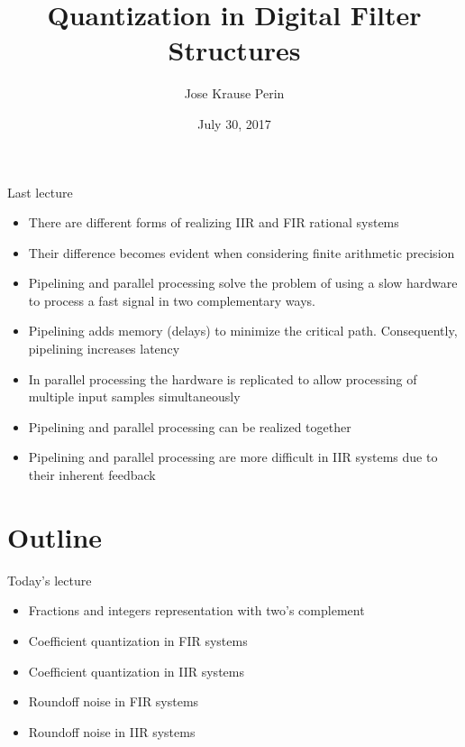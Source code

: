 \documentclass[10pt, aspectratio=169, handout]{beamer}
\title[EE 264]{Quantization in Digital Filter Structures}
\author{Jose Krause Perin}
\institute{Stanford University}
\date{July 30, 2017}
\begin{document}
\begin{frame}
  \titlepage
\end{frame}


\begin{frame}{Last lecture}
\begin{itemize}
	\item There are different forms of realizing IIR and FIR rational systems
	\item Their difference becomes evident when considering finite arithmetic precision
	\item Pipelining and parallel processing solve the problem of using a slow hardware to process a fast signal in two complementary ways. 
	\item Pipelining adds memory (delays) to minimize the critical path. Consequently, pipelining increases latency
	\item In parallel processing the hardware is replicated to allow processing of multiple input samples simultaneously
	\item Pipelining and parallel processing can be realized together
	\item Pipelining and parallel processing are more difficult in IIR systems due to their inherent feedback
\end{itemize}
\end{frame}

%
\section{Outline}
\begin{frame}{Today's lecture}	
	\begin{itemize}
		\item Fractions and integers representation with two's complement
		\item Coefficient quantization in FIR systems
		\item Coefficient quantization in IIR systems
		\item Roundoff noise in FIR systems
		\item Roundoff noise in IIR systems
	\end{itemize}
\end{frame}

%
\end{document}
